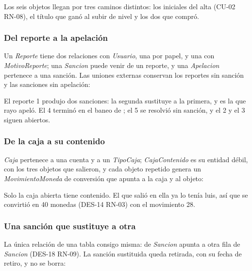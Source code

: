 Los seis objetos llegan por tres caminos distintos: los iniciales del alta (\mbox{CU-02} \mbox{RN-08}), el título que ganó al subir de nivel y los dos que compró.

\subsubsection*{Del reporte a la apelación}

Un \textit{Reporte} tiene dos relaciones con \textit{Usuario}, una por papel, y una con \textit{MotivoReporte}; una \textit{Sancion} puede venir de un reporte, y una \textit{Apelacion} pertenece a una sanción. Las uniones externas conservan los reportes sin sanción y las sanciones sin apelación:



El reporte 1 produjo dos sanciones: la segunda sustituye a la primera, y es la que rayo apeló. El 4 terminó en el baneo de ; el 5 se resolvió sin sanción, y el 2 y el 3 siguen abiertos.

\subsubsection*{De la caja a su contenido}

\textit{Caja} pertenece a una cuenta y a un \textit{TipoCaja}; \textit{CajaContenido} es su entidad débil, con los tres objetos que salieron, y cada objeto repetido genera un \textit{MovimientoMoneda} de conversión que apunta a la caja y al objeto:



Solo la caja abierta tiene contenido. El  que salió en ella ya lo tenía luis, así que se convirtió en 40 monedas (\mbox{DES-14} \mbox{RN-03}) con el movimiento 28.

\subsubsection*{Una sanción que sustituye a otra}

La única relación de una tabla consigo misma:  de \textit{Sancion} apunta a otra fila de \textit{Sancion} (\mbox{DES-18} \mbox{RN-09}). La sanción sustituida queda retirada, con su fecha de retiro, y no se borra:


